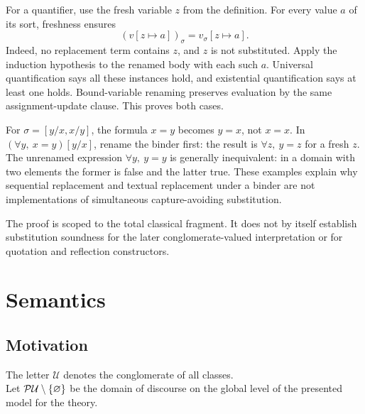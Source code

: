 For a quantifier, use the fresh variable $z$ from the definition.
For every value $a$ of its sort, freshness ensures
\[
(v[z\mapsto a])_\sigma=v_\sigma[z\mapsto a].
\]
Indeed, no replacement term contains $z$, and $z$ is not substituted.
Apply the induction hypothesis to the renamed body with each such $a$.
Universal quantification says all these instances hold, and existential
quantification says at least one holds. Bound-variable renaming preserves
evaluation by the same assignment-update clause. This proves both cases.
\Done

\begin{example}
For $\sigma=[y/x,x/y]$, the formula $x=y$ becomes $y=x$, not $x=x$.
In $(\forall y,\ x=y)[y/x]$, rename the binder first: the result is
$\forall z,\ y=z$ for a fresh $z$. The unrenamed expression
$\forall y,\ y=y$ is generally inequivalent: in a domain with two
elements the former is false and the latter true. These examples explain
why sequential replacement and textual replacement under a binder are
not implementations of simultaneous capture-avoiding substitution.
\end{example}

The proof is scoped to the total classical fragment. It does not by
itself establish substitution soundness for the later conglomerate-valued
interpretation or for quotation and reflection constructors.

\pagebreak

\section{Semantics} %
\subsection{Motivation}
The letter $\mathcal{U}$ denotes the conglomerate of all classes.\\

Let $\mathcal{P} \mathcal{U}\setminus\{\varnothing\}$ be the domain of discourse on the global level of the presented model for the theory.\\



